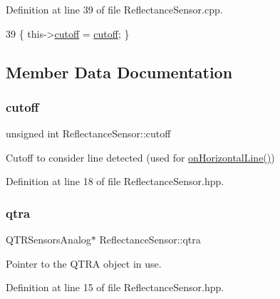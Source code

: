 Definition at line 39 of file Reflectance\+Sensor.\+cpp.


\begin{DoxyCode}
39 \{ this->\hyperlink{class_reflectance_sensor_ab690b7c2e5b1ba69c0068841fe916dbd}{cutoff} = \hyperlink{class_reflectance_sensor_ab690b7c2e5b1ba69c0068841fe916dbd}{cutoff}; \}
\end{DoxyCode}


\subsection{Member Data Documentation}
\mbox{\label{class_reflectance_sensor_ab690b7c2e5b1ba69c0068841fe916dbd}} 
\subsubsection{\texorpdfstring{cutoff}{cutoff}}
{\footnotesize\ttfamily unsigned int Reflectance\+Sensor\+::cutoff\hspace{0.3cm}{\ttfamily [private]}}



Cutoff to consider line detected (used for \hyperlink{class_reflectance_sensor_a30b767c95bec679ff638765050c770e2}{on\+Horizontal\+Line()}) 



Definition at line 18 of file Reflectance\+Sensor.\+hpp.

\mbox{\label{class_reflectance_sensor_a1eb0a090b619705b0234cea224400829}} 
\subsubsection{\texorpdfstring{qtra}{qtra}}
{\footnotesize\ttfamily Q\+T\+R\+Sensors\+Analog$\ast$ Reflectance\+Sensor\+::qtra\hspace{0.3cm}{\ttfamily [private]}}



Pointer to the Q\+T\+RA object in use. 



Definition at line 15 of file Reflectance\+Sensor.\+hpp.


